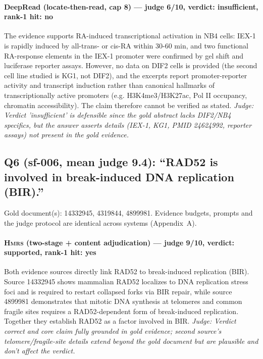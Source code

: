 \documentclass[sigconf, review, anonymous]{acmart}
\begin{document}
\paragraph{DeepRead (locate-then-read, cap 8) --- judge 6/10, verdict: insufficient, rank-1 hit: no}
\noindent The evidence supports RA-induced transcriptional activation in NB4 cells: IEX-1 is rapidly induced by all-trans- or cis-RA within 30-60 min, and two functional RA-response elements in the IEX-1 promoter were confirmed by gel shift and luciferase reporter assays. However, no data on DIF2 cells is provided (the second cell line studied is KG1, not DIF2), and the excerpts report promoter-reporter activity and transcript induction rather than canonical hallmarks of transcriptionally active promoters (e.g. H3K4me3/H3K27ac, Pol II occupancy, chromatin accessibility). The claim therefore cannot be verified as stated.
\noindent\small\textit{Judge: Verdict 'insufficient' is defensible since the gold abstract lacks DIF2/NB4 specifics, but the answer asserts details (IEX-1, KG1, PMID 24624992, reporter assays) not present in the gold evidence.}

\subsection{Q6 (sf-006, mean judge 9.4): ``RAD52 is involved in break-induced DNA replication (BIR).''}
\label{app:q6}
\noindent Gold document(s): 14332945, 4319844, 4899981. Evidence budgets, prompts and the judge protocol are identical across systems (Appendix~A).
\paragraph{\textbf{\textsc{Hmrs}} (two-stage + content adjudication) --- judge 9/10, verdict: supported, rank-1 hit: yes}
\noindent Both evidence sources directly link RAD52 to break-induced replication (BIR). Source 14332945 shows mammalian RAD52 localizes to DNA replication stress foci and is required to restart collapsed forks via BIR repair, while source 4899981 demonstrates that mitotic DNA synthesis at telomeres and common fragile sites requires a RAD52-dependent form of break-induced replication. Together they establish RAD52 as a factor involved in BIR.
\noindent\small\textit{Judge: Verdict correct and core claim fully grounded in gold evidence; second source's telomere/fragile-site details extend beyond the gold document but are plausible and don't affect the verdict.}
\end{document}
